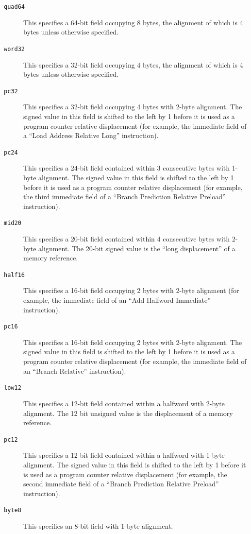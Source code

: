 \documentclass[USenglish,fontsize=11pt,twoside,%
  toc=bib,toc=idx,toc=graduated,numbers=noendperiod,
  bookmarks=true,
  bookmarksnumbered=true,
  bookmarksopen=true,
  bookmarksopenlevel=1,
  breaklinks=true,
  colorlinks=true,
  linkcolor=black,
  pdfpagelayout={TwoPageRight},
  pdfusetitle=true
]{scrreprt}
\begin{document}
\begin{description}
\ifzseries
\item[\texttt{quad64}] This specifies a 64-bit field occupying 8
  bytes, the alignment of which is 4 bytes unless otherwise specified.
\fi
\item[\texttt{word32}] This specifies a 32-bit field occupying 4 bytes, the
  alignment of which is 4 bytes unless otherwise specified.
\ifzseries
\item[\texttt{pc32}] This specifies a 32-bit field occupying 4 bytes
  with 2-byte alignment.  The signed value in this field is shifted to
  the left by 1 before it is used as a program counter relative
  displacement (for example, the immediate field of a ``Load Address
  Relative Long'' instruction).
\item[\texttt{pc24}] This specifies a 24-bit field contained within 3
  consecutive bytes with 1-byte alignment.  The signed value in this field
  is shifted to the left by 1 before it is used as a program counter
  relative displacement (for example, the third immediate field of a
  ``Branch Prediction Relative Preload'' instruction).
\item[\texttt{mid20}] This specifies a 20-bit field contained within 4
  consecutive bytes with 2-byte alignment.  The 20-bit signed value is the
  ``long displacement'' of a memory reference.
\fi
\item[\texttt{half16}] This specifies a 16-bit field occupying 2 bytes with
  2-byte alignment (for example, the immediate field of an ``Add
  Halfword Immediate'' instruction).
\item[\texttt{pc16}] This specifies a 16-bit field occupying 2 bytes
  with 2-byte alignment.  The signed value in this field is shifted to
  the left by 1 before it is used as a program counter relative
  displacement (for example, the immediate field of an ``Branch
  Relative'' instruction).
\item[\texttt{low12}] This specifies a 12-bit field contained within a
  halfword with 2-byte alignment.  The 12 bit unsigned value is the
  displacement of a memory reference.
\item[\texttt{pc12}] This specifies a 12-bit field contained within a
  halfword with 1-byte alignment.  The signed value in this field is
  shifted to the left by 1 before it is used as a program counter relative
  displacement (for example, the second immediate field of a ``Branch
  Prediction Relative Preload'' instruction).
\item[\texttt{byte8}] This specifies an 8-bit field with 1-byte
  alignment.
\end{description}
\end{document}
